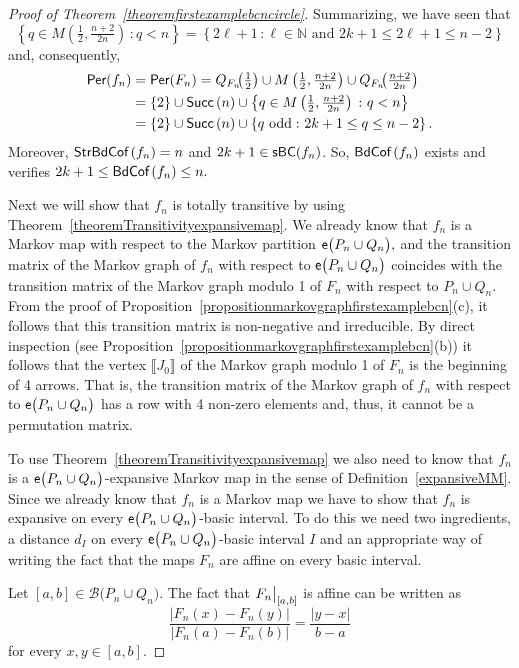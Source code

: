 \documentclass[a4paper, 11pt]{amsart}
\numberwithin{equation}{section}
\theoremstyle{customnumberedtheorem}
\theoremstyle{definitionwithbfnote}
\newcommand{\N}{\ensuremath{\mathbb{N}}}
\DeclareMathOperator{\bc}{\textsf{\upshape BdCof\,}}
\DeclareMathOperator{\sbc}{\textsf{\upshape StrBdCof\,}}
\DeclareMathOperator{\Per}{\textsf{\upshape Per}}
\DeclareMathOperator{\Succ}{\textsf{\upshape Succ}}
\DeclareMathOperator{\sbcset}{\textsf{\upshape sBC}}
\DeclareMathOperator{\eexp}{\textsf{\upshape e}}
\newcommand{\succs}[1]{\ensuremath{\Succ\left(#1\right)}}
\newcommand{\set}[2]{\ensuremath{\left\{#1 \,\colon #2\right\}}}
\newcommand{\BIclass}[1]{\ensuremath{\llbracket #1\rrbracket}}
\newcommand{\bigemap}[1]{\ensuremath{\eexp\bigl(#1\bigr)}}
\def\calB{\mathcal{B}}
\newcommand{\bigSBI}[1]{\ensuremath{\calB\bigl(#1\bigr)}}
\providecommand{\abs}[1]{\ensuremath{\left\lvert#1\right\rvert}}
\newcommand{\evalat}[1]{\bigr\rvert\sb{#1}}
\begin{document}
\begin{proof}[Proof of Theorem~\ref{theoremfirstexamplebcncircle}]
Summarizing, we have seen that
\[
  \set{q \in M\left(\tfrac{1}{2}, \tfrac{n+2}{2n}\right)}{q < n} =
  \set{2\ell+1}{\ell\in\N \text{ and } 2k+1 \le 2\ell+1 \le n-2}
\]
and, consequently,
\begin{align*}
\Per(f_n) & = \Per(F_n) = Q_{F_n}\mspace{-8.0mu}\left(\tfrac{1}{2}\right) \cup
              M\left(\tfrac{1}{2}, \tfrac{n+2}{2n}\right) \cup
              Q_{F_n}\mspace{-8.0mu}\left(\tfrac{n+2}{2n}\right)\\
          & = \{2\} \cup \succs{n} \cup \set{q \in M\left(\tfrac{1}{2}, \tfrac{n+2}{2n}\right)}{q < n}\\
          & = \{2\} \cup \succs{n} \cup \set{q\ \text{odd}}{2k+1 \le q \le n-2}.
\end{align*}
Moreover, $\sbc(f_n) = n$ and $2k+1 \in \sbcset(f_n)$.
So, $\bc(f_n)$ exists and verifies $2k+1 \le \bc(f_n) \le n.$

Next we will show that $f_n$ is totally transitive by using
Theorem~\ref{theoremTransitivityexpansivemap}.
We already know that
$f_n$ is a Markov map with respect to the Markov
partition $\bigemap{P_n \cup Q_n},$
and the transition matrix of the Markov graph of $f_n$
with respect to $\bigemap{P_n \cup Q_n}$
coincides with the transition matrix of the Markov graph modulo 1
of $F_n$ with respect to $P_n \cup Q_n.$
From the proof of
Proposition~\ref{propositionmarkovgraphfirstexamplebcn}(c),
it follows that this transition matrix is non-negative and irreducible.
By direct inspection
(see Proposition~\ref{propositionmarkovgraphfirstexamplebcn}(b))
it follows that the vertex $\BIclass{J_0}$ of
the Markov graph modulo 1 of $F_n$ is the beginning of 4 arrows.
That is, the transition matrix of the Markov graph of $f_n$
with respect to $\bigemap{P_n \cup Q_n}$ has a row with
4 non-zero elements and, thus, it cannot be a permutation matrix.

To use Theorem~\ref{theoremTransitivityexpansivemap} we also need to know
that $f_n$ is a $\bigemap{P_n \cup Q_n}$-expansive Markov map in the sense of
Definition~\ref{expansiveMM}.
Since we already know that $f_n$ is a Markov map we have to show that
$f_n$ is expansive on every $\bigemap{P_n \cup Q_n}$-basic interval.
To do this we need two ingredients, a distance $d_I$ on every
$\bigemap{P_n \cup Q_n}$-basic interval $I$ and an appropriate way of
writing the fact that the maps $F_n$ are affine on every basic interval.

Let $[a,b] \in \bigSBI{P_n \cup Q_n}.$
The fact that $F_n\evalat{[a,b]}$ is affine can be written as
\begin{equation}\label{affineontheline}
 \frac{\abs{F_n(x)-F_n(y)}}{\abs{F_n(a)-F_n(b)}} = \frac{\abs{y-x}}{b-a}
\end{equation}
for every $x,y \in [a,b].$


\end{proof}
\end{document}
